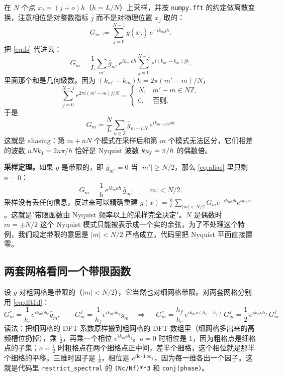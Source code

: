 \documentclass[11pt,UTF8,fontset=none]{ctexart}
\newcommand{\kk}{\mathbf{k}}
\newcommand{\Ny}{{\rm Ny}}
\begin{document}
在 $N$ 个点 $x_j=(j+o)h$（$h=L/N$）上采样，并按 \texttt{numpy.fft} 的约定做离散变换，注意相位是对整数指标 $j$ 而不是对物理位置 $x_j$ 取的：
\begin{equation}
G_m:=\sum_{j=0}^{N-1}g(x_j)\,e^{-ik_m jh}.
\end{equation}
把 \eqref{eq:fs} 代进去：
\begin{equation}
G_m=\frac1L\sum_{m'}\hat g_{m'}\,e^{ik_{m'}oh}\sum_{j=0}^{N-1}e^{i(k_{m'}-k_m)jh}.
\end{equation}
里面那个和是几何级数。因为 $(k_{m'}-k_m)h=2\pi(m'-m)/N$，
\begin{equation}
\sum_{j=0}^{N-1}e^{2\pi i(m'-m)j/N}=\begin{cases}N,& m'-m\in N\mathbb Z,\\ 0,&\text{否则}.\end{cases}
\end{equation}
于是
\begin{equation}
\boxed{\;G_m=\frac{N}{L}\sum_{n\in\mathbb Z}\hat g_{m+nN}\,e^{ik_{m+nN}oh}\;}
\label{eq:alias}
\end{equation}
这就是 aliasing：第 $m+nN$ 个模式在采样后和第 $m$ 个模式无法区分，它们相差的波数 $nN k_1=2n\pi/h$ 恰好是 Nyquist 波数 $k_\Ny=\pi/h$ 的偶数倍。

\textbf{采样定理。}如果 $g$ 是带限的，即 $\hat g_{m'}=0$ 当 $|m'|\ge N/2$，那么 \eqref{eq:alias} 里只剩 $n=0$：
\begin{equation}
G_m=\frac1h\,e^{ik_moh}\,\hat g_m,\qquad |m|<N/2 .
\label{eq:dft1d}
\end{equation}
采样没有丢任何信息，反过来可以精确重建 $g(x)=\frac hL\sum_{|m|<N/2}G_me^{-ik_moh}e^{ik_mx}$。这就是"带限函数由 Nyquist 频率以上的采样完全决定"。$N$ 是偶数时 $m=\pm N/2$ 这个 Nyquist 模式只能被表示成一个实的余弦，为了不处理这个特例，我们规定带限的意思是 $|m|<N/2$ 严格成立，代码里把 Nyquist 平面直接置零。

\subsection{两套网格看同一个带限函数}

设 $g$ 对粗网格是带限的（$|m|<N/2$），它当然也对细网格带限。对两套网格分别用 \eqref{eq:dft1d}：
\begin{equation}
G^c_m=\frac{1}{h_c}e^{ik_moh_c}\hat g_m,\qquad G^f_m=\frac{1}{h_f}e^{ik_moh_f}\hat g_m
\quad\Longrightarrow\quad
\boxed{\;G^c_m=\frac{h_f}{h_c}\,e^{ik_mo(h_c-h_f)}\,G^f_m=\frac12\,e^{ik_moh_f}\,G^f_m\;}
\label{eq:cf1d}
\end{equation}
读法：把细网格的 DFT 系数原样搬到粗网格的 DFT 数组里（细网格多出来的高频槽位扔掉），乘 $\tfrac12$，再乘一个相位 $e^{ik_moh_f}$。$o=0$ 时相位是 1，因为粗格点是细格点的子集；$o=\tfrac12$ 时粗格点在两个细格点正中间，差半个细格，这个相位就是那半个细格的平移。三维时因子是 $\tfrac18$，相位是 $e^{i\kk\cdot\mathbf 1\,oh_f}$，因为每一维各出一个因子。这就是代码里 \texttt{restrict\_spectral} 的 \texttt{(Nc/Nf)**3} 和 \texttt{conj(phase)}。
\end{document}
